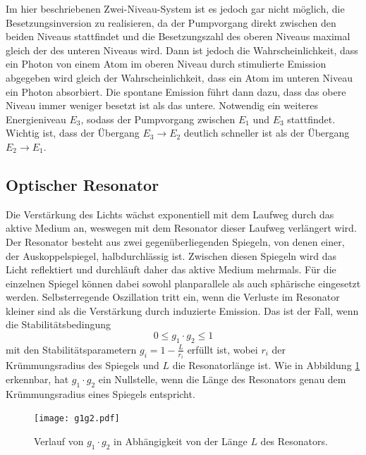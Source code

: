 Im hier beschriebenen Zwei-Niveau-System ist es jedoch gar nicht möglich, die Besetzungsinversion zu realisieren,
da der Pumpvorgang direkt zwischen den beiden Niveaus stattfindet und die Besetzungszahl des oberen Niveaus maximal
gleich der des unteren Niveaus wird. Dann ist jedoch die Wahrscheinlichkeit, dass ein Photon von einem Atom im oberen 
Niveau durch stimulierte Emission abgegeben wird gleich der Wahrscheinlichkeit, dass ein Atom im unteren Niveau ein 
Photon absorbiert. Die spontane Emission führt dann dazu, dass das obere Niveau immer weniger besetzt ist als das untere.
Notwendig ein weiteres Energieniveau $E_3$, sodass der Pumpvorgang zwischen $E_1$ und $E_3$ stattfindet. Wichtig ist,
dass der Übergang $E_3 \rightarrow E_2$ deutlich schneller ist als der Übergang $E_2 \rightarrow E_1$.

\subsection*{Optischer Resonator}
Die Verstärkung des Lichts wächst exponentiell mit dem Laufweg durch das aktive Medium an, weswegen mit dem 
Resonator dieser Laufweg verlängert wird. Der Resonator besteht aus zwei gegenüberliegenden Spiegeln, von denen einer, der Auskoppelspiegel, 
halbdurchlässig ist. Zwischen diesen Spiegeln wird das Licht reflektiert und durchläuft daher das aktive Medium mehrmals.
Für die einzelnen Spiegel können dabei sowohl planparallele als auch sphärische eingesetzt werden. 
Selbsterregende Oszillation tritt ein, wenn die Verluste im Resonator kleiner sind als die Verstärkung durch 
induzierte Emission. Das ist der Fall, wenn die Stabilitätsbedingung
\begin{equation}
    \label{eq:stabil}
    0 \leq g_1 \cdot g_2 \leq 1 
\end{equation}
mit den Stabilitätsparametern $g_i = 1 - \frac{L}{r_i}$ erfüllt ist, wobei $r_i$ der Krümmungsradius des Spiegels
und $L$ die Resonatorlänge ist.
Wie in Abbildung \ref{fig:tfig3} erkennbar, hat $g_1 \cdot g_2$ ein Nullstelle, wenn die Länge des Resonators
genau dem Krümmungsradius eines Spiegels entspricht.
\FloatBarrier
    \begin{figure}[h]
    \centering
    \texttt{[image: g1g2.pdf]}
    \caption{Verlauf von $g_1 \cdot g_2$ in Abhängigkeit von der Länge $L$ des Resonators.}
    \label{fig:tfig3}
    \end{figure}
\FloatBarrier
\noindent

